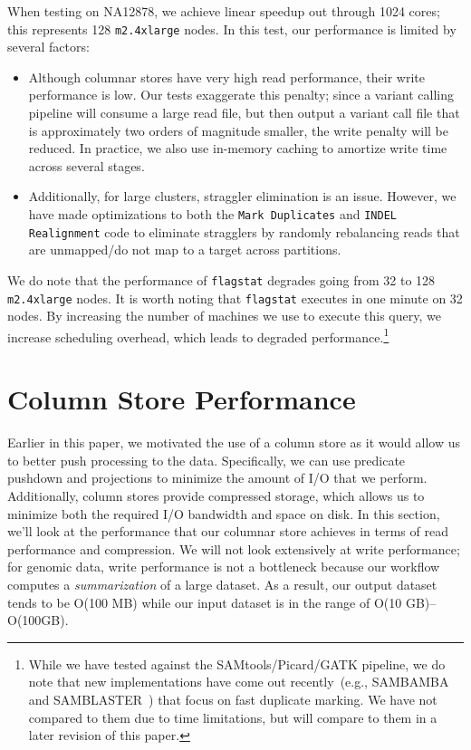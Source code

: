 \documentclass[masters]{ucbthesis}
\begin{document}
When testing on NA12878, we achieve linear speedup out through 1024 cores; this represents 128
\texttt{m2.4xlarge} nodes. In this test, our performance is limited by several factors:

\begin{itemize}
\item Although columnar stores have very high read performance, their write performance is low. Our
tests exaggerate this penalty; since a variant calling pipeline will consume a large read file, but then output a
variant call file that is approximately two orders of magnitude smaller, the write penalty will be reduced. In
practice, we also use in-memory caching to amortize write time across several stages.
\item Additionally, for large clusters, straggler elimination is an issue. However, we have made optimizations to
both the \texttt{Mark Duplicates} and \texttt{INDEL Realignment} code to eliminate stragglers by randomly
rebalancing reads that are unmapped/do not map to a target across partitions.
\end{itemize}

We do note that the performance of \texttt{flagstat} degrades going from 32 to 128 \texttt{m2.4xlarge} nodes.
It is worth noting that \texttt{flagstat} executes in one minute on 32 nodes. By increasing the number of machines
we use to execute this query, we increase scheduling overhead, which leads to degraded
performance.\footnote{While we
have tested against the SAMtools/Picard/GATK pipeline, we do note that new implementations have come out
recently~(e.g., SAMBAMBA and SAMBLASTER~\cite{faust14}) that focus on fast duplicate marking. We have not
compared to them due to time limitations, but will compare to them in a later revision of this paper.}

\section{Column Store Performance}
\label{sec:column-store-perf}

Earlier in this paper, we motivated the use of a column store as it would allow us to better push processing to
the data. Specifically, we can use predicate pushdown and projections to minimize the amount of I/O that we
perform. Additionally, column stores provide compressed storage, which allows us to minimize both the required
I/O bandwidth and space on disk. In this section, we'll look at the performance that our columnar store achieves
in terms of read performance and compression. We will not look extensively at write performance; for genomic
data, write performance is not a bottleneck because our workflow computes a \emph{summarization} of a large
dataset. As a result, our output dataset tends to be O(100 MB) while our input dataset is in the range of
O(10 GB)--O(100GB).
\end{document}
